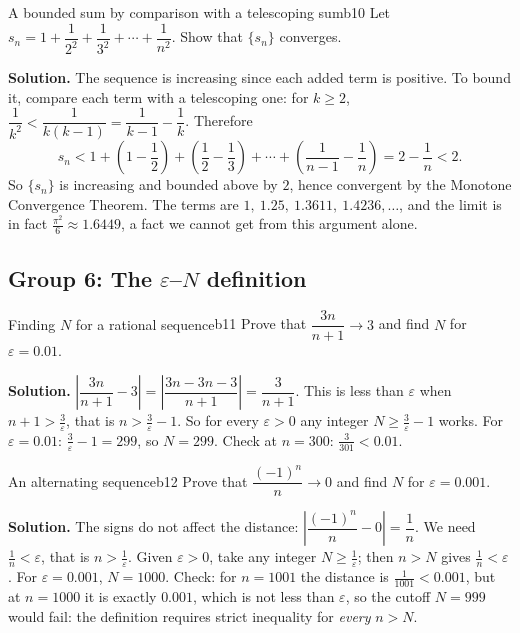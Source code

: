 \documentclass[11pt]{article}
\begin{document}
\begin{exmp}{A bounded sum by comparison with a telescoping sum}{b10}
Let $s_n=1+\dfrac1{2^2}+\dfrac1{3^2}+\cdots+\dfrac1{n^2}$. Show that $\{s_n\}$ converges.

\textbf{Solution.} The sequence is increasing since each added term is positive. To bound it, compare each term with a telescoping one: for $k\ge2$, $\dfrac1{k^2}<\dfrac1{k(k-1)}=\dfrac1{k-1}-\dfrac1k$. Therefore
\[
s_n<1+\left(1-\frac12\right)+\left(\frac12-\frac13\right)+\cdots+\left(\frac1{n-1}-\frac1n\right)=2-\frac1n<2 .
\]
So $\{s_n\}$ is increasing and bounded above by $2$, hence convergent by the Monotone Convergence Theorem. The terms are $1,\ 1.25,\ 1.3611,\ 1.4236,\dots$, and the limit is in fact $\frac{\pi^2}6\approx1.6449$, a fact we cannot get from this argument alone.
\end{exmp}

\subsection*{Group 6: The $\varepsilon$--$N$ definition}

\begin{exmp}{Finding $N$ for a rational sequence}{b11}
Prove that $\dfrac{3n}{n+1}\to3$ and find $N$ for $\varepsilon=0.01$.

\textbf{Solution.} $\left|\dfrac{3n}{n+1}-3\right|=\left|\dfrac{3n-3n-3}{n+1}\right|=\dfrac3{n+1}$. This is less than $\varepsilon$ when $n+1>\frac3\varepsilon$, that is $n>\frac3\varepsilon-1$. So for every $\varepsilon>0$ any integer $N\ge\frac3\varepsilon-1$ works. For $\varepsilon=0.01$: $\frac3\varepsilon-1=299$, so $N=299$. Check at $n=300$: $\frac3{301}<0.01$.
\end{exmp}

\begin{exmp}{An alternating sequence}{b12}
Prove that $\dfrac{(-1)^n}{n}\to0$ and find $N$ for $\varepsilon=0.001$.

\textbf{Solution.} The signs do not affect the distance: $\left|\dfrac{(-1)^n}n-0\right|=\dfrac1n$. We need $\frac1n<\varepsilon$, that is $n>\frac1\varepsilon$. Given $\varepsilon>0$, take any integer $N\ge\frac1\varepsilon$; then $n>N$ gives $\frac1n<\varepsilon$. For $\varepsilon=0.001$, $N=1000$. Check: for $n=1001$ the distance is $\frac1{1001}<0.001$, but at $n=1000$ it is exactly $0.001$, which is not less than $\varepsilon$, so the cutoff $N=999$ would fail: the definition requires strict inequality for \emph{every} $n>N$.
\end{exmp}
\end{document}
